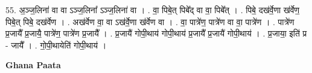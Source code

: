 \documentclass[17pt]{extarticle}
\begin{document}
55. अ॒ञ्ज॒लिना॑ वा वा ऽञ्ज॒लिना᳚ ऽञ्ज॒लिना॑ वा । . वा॒ पिबे॒त् पिबे᳚द् वा वा॒ पिबे᳚त् । . पिबे॒ दख॑र्वे॒णा ख॑र्वेण॒ पिबे॒त् पिबे॒ दख॑र्वेण । . अख॑र्वेण वा॒ वा ऽख॑र्वे॒णा ख॑र्वेण वा । . वा॒ पात्रे॑ण॒ पात्रे॑ण वा वा॒ पात्रे॑ण । . पात्रे॑ण प्र॒जायै᳚ प्र॒जायै॒ पात्रे॑ण॒ पात्रे॑ण प्र॒जायै᳚ । . प्र॒जायै॑ गोपी॒थाय॑ गोपी॒थाय॑ प्र॒जायै᳚ प्र॒जायै॑ गोपी॒थाय॑ । . प्र॒जाया॒ इति॑ प्र - जायै᳚ । . गो॒पी॒थायेति॑ गोपी॒थाय॑ । \newline

\textbf{Ghana Paata } \newline
\end{document}
